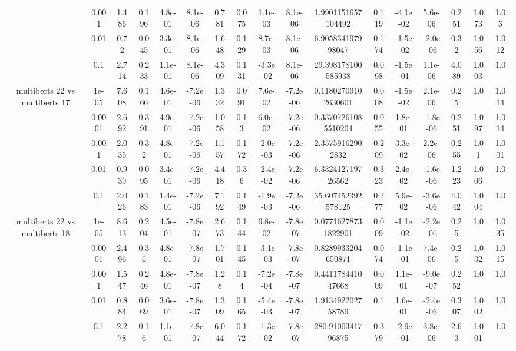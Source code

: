 \begin{tabular}{|c|c|c|c|c|c|c|c|c|c|c|c|c|c|c|c|c|}
 & 0.001 & 1.486 & 0.196 & 4.8e-01 & 8.1e-06 & 0.781 & 0.075 & 1.1e-03 & 8.1e-06 & 1.9901151657104492 & 0.119 & -4.1e-02 & 5.6e-06 & 0.251 & 1.073 & 1.03 \\
 & 0.01 & 0.72 & 0.045 & 3.3e-01 & 8.1e-06 & 1.648 & 0.129 & 8.7e-03 & 8.1e-06 & 6.905834197998047 & 0.174 & -1.5e-02 & -2.0e-06 & 0.32 & 1.056 & 1.012 \\
 & 0.1 & 2.714 & 0.233 & 1.1e-01 & 8.1e-06 & 4.309 & 0.131 & -3.3e-02 & 8.1e-06 & 29.398178100585938 & 0.098 & -1.5e-01 & 1.1e-06 & 4.089 & 1.003 & 1.0 \\
\hline
\multirow{5}{*}{multiberts 22 vs multiberts 17} & 1e-05 & 7.608 & 0.166 & 4.6e-01 & -7.2e-06 & 1.332 & 0.091 & 7.6e-02 & -7.2e-06 & 0.11802709102630601 & 0.008 & -1.5e-02 & 2.1e-06 & 0.25 & 1.0 & 1.014 \\
 & 0.0001 & 2.692 & 0.391 & 4.9e-01 & -7.2e-06 & 1.058 & 0.13 & 6.0e-02 & -7.2e-06 & 0.33707261085510204 & 0.055 & 1.8e-01 & -1.8e-06 & 0.251 & 1.097 & 1.014 \\
 & 0.001 & 2.035 & 0.32 & 4.8e-01 & -7.2e-06 & 1.157 & 0.172 & -2.0e-03 & -7.2e-06 & 2.35759162902832 & 0.209 & 3.3e-02 & 2.2e-06 & 0.255 & 1.01 & 1.001 \\
 & 0.01 & 0.939 & 0.095 & 3.4e-01 & -7.2e-06 & 4.418 & 0.36 & -2.4e-02 & -7.2e-06 & 6.332412719726562 & 0.323 & 2.4e-02 & -1.6e-06 & 1.223 & 1.006 & 1.0 \\
 & 0.1 & 2.026 & 0.183 & 1.4e-01 & -7.2e-06 & 7.192 & 0.149 & -1.9e-03 & -7.2e-06 & 35.607452392578125 & 0.277 & 5.9e-02 & -3.6e-06 & 4.042 & 1.004 & 1.0 \\
\hline
\multirow{5}{*}{multiberts 22 vs multiberts 18} & 1e-05 & 8.613 & 0.204 & 4.5e-01 & -7.8e-07 & 2.673 & 0.144 & 6.8e-02 & -7.8e-07 & 0.07716278731822901 & 0.009 & -1.1e-02 & -2.2e-06 & 0.25 & 1.0 & 1.035 \\
 & 0.0001 & 2.496 & 0.36 & 4.8e-01 & -7.8e-07 & 1.701 & 0.145 & -3.1e-03 & -7.8e-07 & 0.8289933204650871 & 0.074 & -1.1e-01 & 7.4e-06 & 0.25 & 1.032 & 1.015 \\
 & 0.001 & 1.547 & 0.246 & 4.8e-01 & -7.8e-07 & 1.28 & 0.14 & -7.2e-04 & -7.8e-07 & 0.441178441047668 & 0.009 & 1.1e-01 & -9.0e-07 & 0.252 & 1.0 & 1.0 \\
 & 0.01 & 0.884 & 0.069 & 3.6e-01 & -7.8e-07 & 1.309 & 0.165 & -5.4e-03 & -7.8e-07 & 1.913492202758789 & 0.1 & 1.6e-01 & -2.4e-06 & 0.307 & 1.002 & 1.0 \\
 & 0.1 & 2.278 & 0.16 & 1.1e-01 & -7.8e-07 & 6.044 & 0.172 & -1.3e-02 & -7.8e-07 & 280.9100341796875 & 0.379 & -2.9e-01 & 3.8e-06 & 2.63 & 1.001 & 1.0 \\

\end{tabular}

